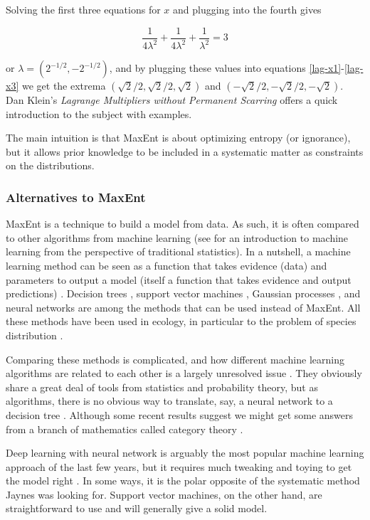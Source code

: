 \documentclass[letterpaper,12pt]{article}
\begin{document}
Solving the first three equations for $x$ and plugging into the fourth gives

\begin{equation}
  \frac{1}{4\lambda^2} + \frac{1}{4\lambda^2} + \frac{1}{\lambda^2} = 3
\end{equation}

or $\lambda = (2^{-1/2}, -2^{-1/2})$, and by plugging these values into
equations \ref{lag-x1}-\ref{lag-x3} we get the extrema $(\sqrt{2}/2,
\sqrt{2}/2, \sqrt{2})$ and $(-\sqrt{2}/2, -\sqrt{2}/2, -\sqrt{2})$. Dan
Klein's \emph{Lagrange Multipliers without Permanent Scarring} \cite{kle04}
offers a quick introduction to the subject with examples.

The main intuition is that MaxEnt is about optimizing entropy (or
ignorance), but it allows prior knowledge to be included in a systematic
matter as constraints on the distributions.

\subsubsection{Alternatives to MaxEnt}

MaxEnt is a technique to build a model from data. As such, it is often
compared to other algorithms from machine learning \cite{mur12} (see \cite
{has09} for an introduction to machine learning from the perspective of
traditional statistics).  In a nutshell, a machine learning method can be
seen as a function that takes evidence (data) and parameters to output a
model (itself a function that takes evidence and output predictions) \cite
{mit06,old08,mur12}. Decision trees \cite{qui86,cut07}, support vector
machines \cite{cor95}, Gaussian processes \cite{ras06}, and neural networks
\cite{ros58,sal09,hin10} are among the methods that can be used instead of
MaxEnt. All these methods have been used in ecology, in particular to the
problem of species distribution \cite{fra10}.

Comparing these methods is complicated, and how different machine learning
algorithms are related to each other is a largely unresolved issue \cite
{mit06}. They obviously share a great deal of tools from statistics and
probability theory, but as algorithms, there is no obvious way to translate,
say, a neural network to a decision tree \cite{mur12}. Although some recent
results \cite{izb13a,izb13b} suggest we might get some answers from a branch
of mathematics called category theory \cite{bar10,sim11}.

Deep learning with neural network is arguably the most popular machine
learning approach of the last few years, but it requires much tweaking and
toying to get the model right \cite{hin10}. In some ways, it is the polar
opposite of the systematic method Jaynes was looking for. Support vector
machines, on the other hand, are straightforward to use and will generally
give a solid model.
\end{document}
